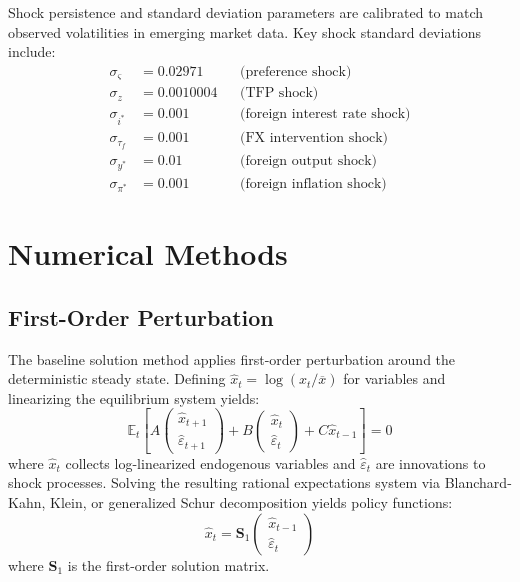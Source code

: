 \documentclass[12pt]{article}
\begin{document}
Shock persistence and standard deviation parameters are calibrated to match observed volatilities in emerging market data. Key shock standard deviations include:
\begin{align*}
\sigma_\varsigma &= 0.02971 & &\text{(preference shock)} \\
\sigma_z &= 0.0010004 & &\text{(TFP shock)} \\
\sigma_{i^*} &= 0.001 & &\text{(foreign interest rate shock)} \\
\sigma_{\tau_f} &= 0.001 & &\text{(FX intervention shock)} \\
\sigma_{y^*} &= 0.01 & &\text{(foreign output shock)} \\
\sigma_{\pi^*} &= 0.001 & &\text{(foreign inflation shock)}
\end{align*}

\section{Numerical Methods}\label{sec:numerical}

\subsection{First-Order Perturbation}

The baseline solution method applies first-order perturbation around the deterministic steady state. Defining $\hat{x}_t = \log(x_t/\overline{x})$ for variables and linearizing the equilibrium system yields:
\begin{equation}
\mathbb{E}_t \left[ A \begin{pmatrix} \hat{x}_{t+1} \\ \hat{\varepsilon}_{t+1} \end{pmatrix} + B \begin{pmatrix} \hat{x}_t \\ \hat{\varepsilon}_t \end{pmatrix} + C \hat{x}_{t-1} \right] = 0
\end{equation}
where $\hat{x}_t$ collects log-linearized endogenous variables and $\hat{\varepsilon}_t$ are innovations to shock processes. Solving the resulting rational expectations system via Blanchard-Kahn, Klein, or generalized Schur decomposition yields policy functions:
\begin{equation}
\hat{x}_t = \mathbf{S}_1 \begin{pmatrix} \hat{x}_{t-1} \\ \hat{\varepsilon}_t \end{pmatrix}
\end{equation}
where $\mathbf{S}_1$ is the first-order solution matrix.
\end{document}
